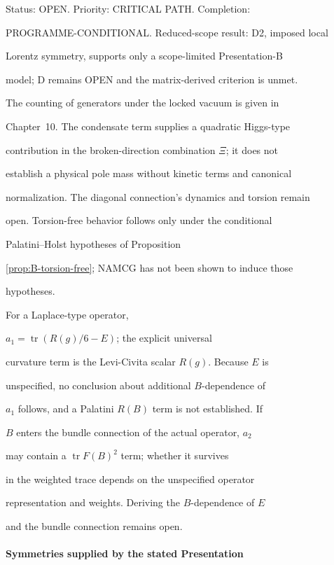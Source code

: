 Status: OPEN. Priority: CRITICAL PATH. Completion:

PROGRAMME-CONDITIONAL. Reduced-scope result: D2, imposed local

Lorentz symmetry, supports only a scope-limited Presentation-B

model; D remains OPEN and the matrix-derived criterion is unmet.



The counting of generators under the locked vacuum is given in

Chapter~10. The condensate term supplies a quadratic Higgs-type

contribution in the broken-direction combination \(\Xi\); it does not

establish a physical pole mass without kinetic terms and canonical

normalization. The diagonal connection's dynamics and torsion remain

open. Torsion-free behavior follows only under the conditional

Palatini--Holst hypotheses of Proposition~

\ref{prop:B-torsion-free}; NAMCG has not been shown to induce those

hypotheses.



For a Laplace-type operator,

\(a_1=\operatorname{tr}(R(g)/6-E)\); the explicit universal

curvature term is the Levi-Civita scalar \(R(g)\). Because \(E\) is

unspecified, no conclusion about additional \(B\)-dependence of

\(a_1\) follows, and a Palatini \(R(B)\) term is not established. If

\(B\) enters the bundle connection of the actual operator, \(a_2\)

may contain a \(\operatorname{tr}F(B)^2\) term; whether it survives

in the weighted trace depends on the unspecified operator

representation and weights. Deriving the \(B\)-dependence of \(E\)

and the bundle connection remains open.





\paragraph{Symmetries supplied by the stated Presentation~} \label{detail:sec-C-paragraphsymmetriessuppliedbyt-13}

